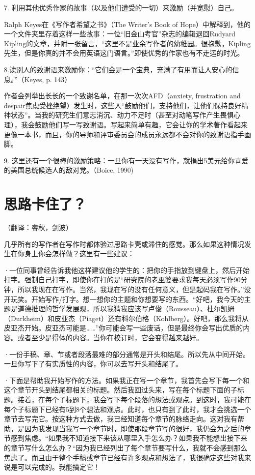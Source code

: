 \documentclass{ctexart}
\begin{document}
7. 利用其他优秀作家的故事（以及他们遭受的一切）来激励（并宽慰）自己。

Ralph Keyes在《写作者希望之书》（The Writer's Book of Hope）中解释到，他的一个文件夹里存着这样一些故事：一位“旧金山考官”杂志的编辑退回Rudyard Kipling的文章，并附一张留言，“这里不是业余写作者的幼稚园。很抱歉，Kipling先生，但是你真的并不会用英语这门语言。”即使优秀的作家也有不走运的时光。

8.读别人的致谢语来激励你：“它们会是一个宝典，充满了有用而让人安心的信息。”（Keyes, p. 143）

作者会列举出长长的一个致谢名单，在那一次次AFD（anxiety, frustration and despair焦虑受挫绝望）发生时，这些人“鼓励他们，支持他们，让他们保持良好精神状态”。当我的研究生们意志消沉、动力不足时（甚至对动笔写作产生畏惧心理），我会鼓励他们写一写致谢语。写起来简单有趣，它会让你的学术著作看起来更像一本书，而且，你的导师和评审委员会的成员永远都不会对你的致谢语指手画脚。

9. 这里还有一个很棒的激励策略：一旦你有一天没有写作，就捐出5美元给你喜爱的美国总统候选人的敌对党。（Boice, 1990)

\section{思路卡住了？}
（翻译：睿秋，剑波）

几乎所有的写作者在写作时都体验过思路卡壳或滞住的感觉。那么如果这种情况发生在你身上你会怎样做？这里有一些建议：

·一位同事曾经告诉我他这样建议他的学生的：把你的手指放到键盘上，然后开始打字。强制自己打字，即使你在打的是“研究院的老巫婆要求我每天必须写作90分钟，所以我现在在写作。当然，我现在写的没有任何意义，但是起码我在写作。”没开玩笑。开始写作/打字。想一想你的主题和你想要写的东西。“好吧，我今天的主题是道德推理的哲学发展观，所以我猜我应该写卢俊（Rousseau）、杜尔凯姆（Durkheim）和皮亚杰（Piaget）还有科尔伯格（Kohlberg）。好吧，那么我将从皮亚杰开始。皮亚杰可能是……”你可能会写一些废话，但是最终你会写出优质的内容。或者至少是得体的内容。当你在校订时，它会变得越来越好。

·一份手稿、章、节或者段落最难的部分通常是开头和结尾。所以先从中间开始。一旦你写下了有实质性的内容，你可以去写开头和结尾了。

·下面是帮助我开始写作的方法。如果我正在写一个章节，我首先会写下每一个和这个章节开头到结尾都相关的标题。然后我回过头来，写在每个标题下面的子标题。接着，在每个子标题下，我会写下每个段落的想法或观点。到这时，我可能在每个子标题下已经有5到8个想法和观点。此时，也只有到了此时，我才会挑选一个章节去写完它。按这种方式去做，我已经知道每个章节的脉络走向。这对我有帮助，是因为我发现当我写一个章节时，即使那段章节写的很好，我仍会为之后的章节感到焦虑。“如果我不知道接下来该从哪里入手怎么办？如果我不能想出接下来的章节写什么怎么办？“因为我已经列出了每个章节要写什么，我就不会感到那么焦虑了。而且由于整个手稿或章节已经有许多观点和想法了，我很确定这些对我来说是可以完成的。我能搞定它！
\end{document}
